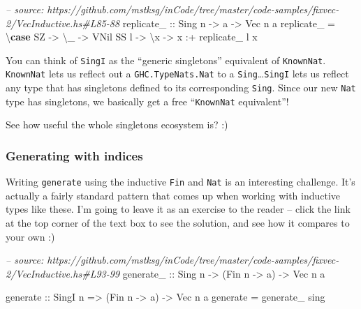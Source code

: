 \documentclass[]{article}
\newenvironment{Shaded}{}{}
\newcommand{\KeywordTok}[1]{\textcolor[rgb]{0.00,0.44,0.13}{\textbf{#1}}}
\newcommand{\DataTypeTok}[1]{\textcolor[rgb]{0.56,0.13,0.00}{#1}}
\newcommand{\CommentTok}[1]{\textcolor[rgb]{0.38,0.63,0.69}{\textit{#1}}}
\newcommand{\OtherTok}[1]{\textcolor[rgb]{0.00,0.44,0.13}{#1}}
\newcommand{\FunctionTok}[1]{\textcolor[rgb]{0.02,0.16,0.49}{#1}}
\newcommand{\NormalTok}[1]{#1}
\begin{document}
\begin{Shaded}
\begin{Highlighting}[]
\CommentTok{-- source: https://github.com/mstksg/inCode/tree/master/code-samples/fixvec-2/VecInductive.hs#L85-88}
\OtherTok{replicate_ ::} \DataTypeTok{Sing}\NormalTok{ n }\OtherTok{->}\NormalTok{ a }\OtherTok{->} \DataTypeTok{Vec}\NormalTok{ n a}
\NormalTok{replicate_ }\FunctionTok{=}\NormalTok{ \textbackslash{}}\KeywordTok{case}
    \DataTypeTok{SZ}   \OtherTok{->}\NormalTok{ \textbackslash{}_ }\OtherTok{->} \DataTypeTok{VNil}
    \DataTypeTok{SS}\NormalTok{ l }\OtherTok{->}\NormalTok{ \textbackslash{}x }\OtherTok{->}\NormalTok{ x }\FunctionTok{:+}\NormalTok{ replicate_ l x}
\end{Highlighting}
\end{Shaded}

You can think of \texttt{SingI} as the ``generic singletons'' equivalent of
\texttt{KnownNat}. \texttt{KnownNat} lets us reflect out a
\texttt{GHC.TypeNats.Nat} to a \texttt{Sing}\ldots{}\texttt{SingI} lets us
reflect any type that has singletons defined to its corresponding \texttt{Sing}.
Since our new \texttt{Nat} type has singletons, we basically get a free
``\texttt{KnownNat} equivalent''!

See how useful the whole singletons ecosystem is? :)

\subsubsection{Generating with indices}\label{generating-with-indices-1}

Writing \texttt{generate} using the inductive \texttt{Fin} and \texttt{Nat} is
an interesting challenge. It's actually a fairly standard pattern that comes up
when working with inductive types like these. I'm going to leave it as an
exercise to the reader -- click the link at the top corner of the text box to
see the solution, and see how it compares to your own :)

\begin{Shaded}
\begin{Highlighting}[]
\CommentTok{-- source: https://github.com/mstksg/inCode/tree/master/code-samples/fixvec-2/VecInductive.hs#L93-99}
\OtherTok{generate_ ::} \DataTypeTok{Sing}\NormalTok{ n }\OtherTok{->}\NormalTok{ (}\DataTypeTok{Fin}\NormalTok{ n }\OtherTok{->}\NormalTok{ a) }\OtherTok{->} \DataTypeTok{Vec}\NormalTok{ n a}

\OtherTok{generate ::} \DataTypeTok{SingI}\NormalTok{ n }\OtherTok{=>}\NormalTok{ (}\DataTypeTok{Fin}\NormalTok{ n }\OtherTok{->}\NormalTok{ a) }\OtherTok{->} \DataTypeTok{Vec}\NormalTok{ n a}
\NormalTok{generate }\FunctionTok{=}\NormalTok{ generate_ sing}
\end{Highlighting}
\end{Shaded}
\end{document}
